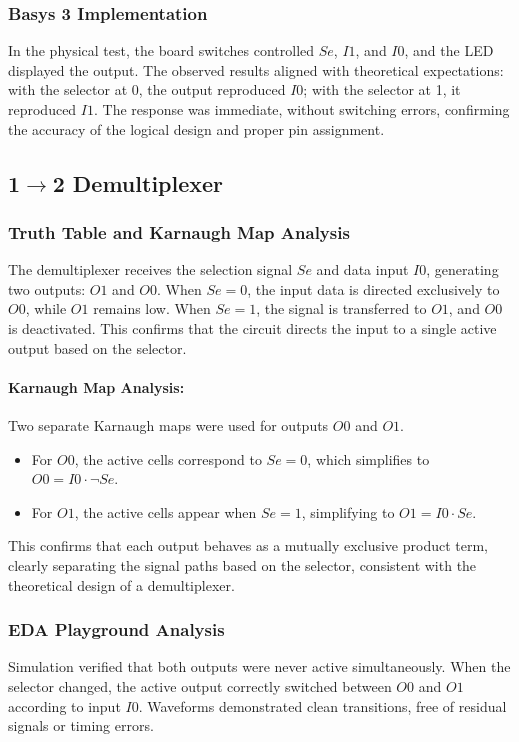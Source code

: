 \documentclass[12pt]{article}  %
\begin{document}
\subsubsection{Basys 3 Implementation}
In the physical test, the board switches controlled $Se$, $I1$,
and $I0$, and the LED displayed the output. The observed results aligned with
theoretical expectations: with the selector at 0, the output reproduced $I0$;
with the selector at 1, it reproduced $I1$. The response was immediate, without
switching errors, confirming the accuracy of the logical design and proper pin
assignment.

\subsection{1$\to$2 Demultiplexer}

\subsubsection{Truth Table and Karnaugh Map Analysis}
The demultiplexer receives the selection signal $Se$ and
data input $I0$, generating two outputs: $O1$ and $O0$.
When $Se = 0$, the input data is directed exclusively to $O0$, while $O1$ remains
low. When $Se = 1$, the signal is transferred to $O1$, and $O0$ is deactivated. This
confirms that the circuit directs the input to a single active output based on
the selector.

\paragraph{Karnaugh Map Analysis:}
Two separate Karnaugh maps were used for outputs $O0$ and $O1$.
\begin{itemize}
    \item For $O0$, the active cells correspond to $Se = 0$, which
        simplifies to $O0 = I0 \cdot \neg Se$.
    \item For $O1$, the active cells appear when $Se = 1$, simplifying
        to $O1 = I0 \cdot Se$.
\end{itemize}
This confirms that each output behaves as a mutually exclusive product
term, clearly separating the signal paths based on the selector,
consistent with the theoretical design of a demultiplexer.

\subsubsection{EDA Playground Analysis}
Simulation verified that both outputs were never active
simultaneously. When the selector changed, the active output correctly switched
between $O0$ and $O1$ according to input $I0$. Waveforms demonstrated clean
transitions, free of residual signals or timing errors.
\end{document}
